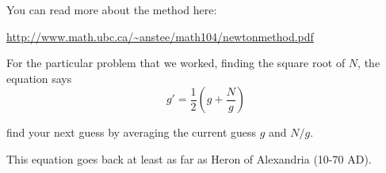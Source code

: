 \documentclass[11pt, oneside]{article}
\begin{document}
You can read more about the method here:

\url{http://www.math.ubc.ca/~anstee/math104/newtonmethod.pdf}

For the particular problem that we worked, finding the square root of $N$, the equation says
\[ g' = \frac{1}{2} (g + \frac{N}{g}) \]

find your next guess by averaging the current guess $g$ and $N/g$.  

This equation goes back at least as far as Heron of Alexandria (10-70 AD).
\end{document}
